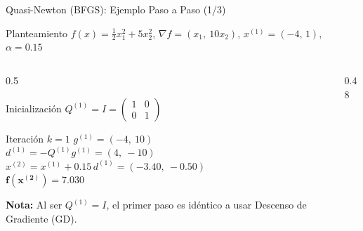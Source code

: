 \begin{frame}{Quasi-Newton (BFGS): Ejemplo Paso a Paso (1/3)}
    \begin{exampleblock}{Planteamiento}
        \scriptsize
        $f(x)=\tfrac12x_1^2+5x_2^2$, \quad $\nabla f=(x_1,\ 10x_2)$, \quad
        $x^{(1)}=(-4,\,1)$, \quad $\alpha=0.15$
    \end{exampleblock}

    \begin{columns}[T]
        \begin{column}{0.5\textwidth}
            \begin{block}{Inicialización}
                \scriptsize
                $Q^{(1)}=I=\begin{pmatrix} 1 & 0 \\ 0 & 1 \end{pmatrix}$
            \end{block}
            \begin{block}{Iteración $k=1$}
                \scriptsize
                $g^{(1)}=(-4,\ 10)$\\[2pt]
                $d^{(1)}=-Q^{(1)}g^{(1)}=(4,\ -10)$\\[2pt]
                $x^{(2)}=x^{(1)} + 0.15\, d^{(1)} = (-3.40,\ -0.50)$\\[2pt]
                $\mathbf{f(x^{(2)})=7.030}$
            \end{block}
            {\scriptsize \textbf{Nota:} Al ser $Q^{(1)}=I$, el primer paso es idéntico a usar Descenso de Gradiente (GD).\par}
        \end{column}
        \begin{column}{0.48\textwidth}
            \centering
        \end{column}
    \end{columns}
\end{frame}

